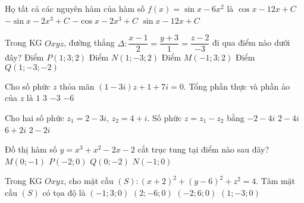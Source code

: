 \begin{ex}%
	Họ tất cả các nguyên hàm của hàm số $f(x)=\sin x-6x^2$ là
	\choice
	{$\cos x-12x+C$}
	{$-\sin x-2x^3+C$}
	{\True $-\cos x-2x^3+C$}
	{$\sin x-12x+C$}
\end{ex}
\begin{ex}%
	Trong KG $Oxyz$, đường thẳng $\Delta\colon \dfrac{x-1}{2}=\dfrac{y+3}{1}=\dfrac{z-2}{-3}$ đi qua điểm nào dưới đây?
	\choice
	{Điểm $P(1;3;2)$}
	{\True Điểm $N(1;-3;2)$}
	{Điểm $M(-1;3;2)$}
	{Điểm $Q(1;-3;-2)$}
\end{ex}
\begin{ex}%
	Cho số phức $z$ thỏa mãn $(1-3i)z+1+7i=0$. Tổng phần thực và phần ảo của $z$ là
	\choice
	{\True $1$}
	{$3$}
	{$-3$}
	{$-6$}
\end{ex}
\begin{ex}%
	Cho hai số phức $z_1=2-3i$, $z_2=4+i$. Số phức $z=z_1-z_2$ bằng
	\choice
	{\True $-2-4i$}
	{$2-4i$}
	{$6+2i$}
	{$2-2i$}
\end{ex}
\begin{ex}%
	Đồ thị hàm số $y=x^3+x^2-2x-2$ cắt trục tung tại điểm nào sau đây?
	\choice
	{$M(0;-1)$}
	{$P(-2;0)$}
	{\True $Q(0;-2)$}
	{$N(-1;0)$}
\end{ex}
\begin{ex}%
	Trong KG $Oxyz$, cho mặt cầu $(S)\colon (x+2)^2+(y-6)^2+z^2=4$. Tâm mặt cầu $(S)$ có tọa độ là
	\choice
	{$(-1;3;0)$}
	{$(2;-6;0)$}
	{\True $(-2;6;0)$}
	{$(1;-3;0)$}
\end{ex}
